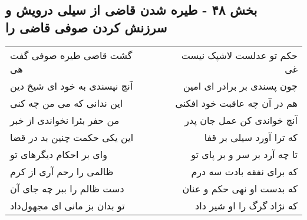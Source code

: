 \begin{center}
\section*{بخش ۴۸ - طیره شدن قاضی از سیلی درویش و سرزنش کردن صوفی قاضی را}
\label{sec:sh048}
\begin{longtable}{l p{0.5cm} r}
گشت قاضی طیره صوفی گفت هی
&&
حکم تو عدلست لاشپک نیست غی
\\
آنچ نپسندی به خود ای شیخ دین
&&
چون پسندی بر برادر ای امین
\\
این ندانی که می من چه کنی
&&
هم در آن چه عاقبت خود افکنی
\\
من حفر بئرا نخواندی از خبر
&&
آنچ خواندی کن عمل جان پدر
\\
این یکی حکمت چنین بد در قضا
&&
که ترا آورد سیلی بر قفا
\\
وای بر احکام دیگرهای تو
&&
تا چه آرد بر سر و بر پای تو
\\
ظالمی را رحم آری از کرم
&&
که برای نفقه بادت سه درم
\\
دست ظالم را ببر چه جای آن
&&
که بدست او نهی حکم و عنان
\\
تو بدان بز مانی ای مجهول‌داد
&&
که نژاد گرگ را او شیر داد
\\
\end{longtable}
\end{center}
